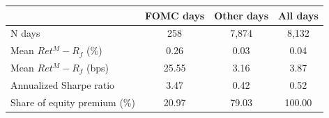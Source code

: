 \begin{tabular}{lccc}
\toprule
 & FOMC days & Other days & All days \\
\midrule
N days & 258 & 7,874 & 8,132 \\
Mean $Ret^M-R_f$ (\%) & 0.26 & 0.03 & 0.04 \\
Mean $Ret^M-R_f$ (bps) & 25.55 & 3.16 & 3.87 \\
Annualized Sharpe ratio & 3.47 & 0.42 & 0.52 \\
Share of equity premium (\%) & 20.97 & 79.03 & 100.00 \\
\bottomrule
\end{tabular}
